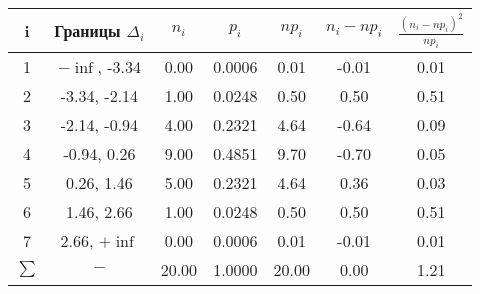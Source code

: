 \begin{tabular}{|c|c|c|c|c|c|c|}
\hline
\hline i & Границы $\Delta_i$ & $n_i$ & $p_i$ & $np_i$ & $n_i - np_i$ & $\frac{(n_i - np_i)^2}{np_i}$\\
\hline
1 & $-\inf$, -3.34 & 0.00 & 0.0006 & 0.01 & -0.01 & 0.01\\
\hline
2 & -3.34, -2.14 & 1.00 & 0.0248 & 0.50 & 0.50 & 0.51\\
\hline
3 & -2.14, -0.94 & 4.00 & 0.2321 & 4.64 & -0.64 & 0.09\\
\hline
4 & -0.94, 0.26 & 9.00 & 0.4851 & 9.70 & -0.70 & 0.05\\
\hline
5 & 0.26, 1.46 & 5.00 & 0.2321 & 4.64 & 0.36 & 0.03\\
\hline
6 & 1.46, 2.66 & 1.00 & 0.0248 & 0.50 & 0.50 & 0.51\\
\hline
7 & 2.66, $+\inf$ & 0.00 & 0.0006 & 0.01 & -0.01 & 0.01\\
\hline
$\sum$ & $-$ & 20.00 & 1.0000 & 20.00 & 0.00 & 1.21\\
\hline
\end{tabular}